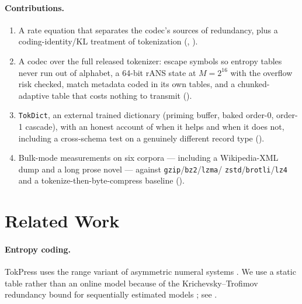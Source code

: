 \documentclass[10pt,twocolumn]{article}
\theoremstyle{plain}
\theoremstyle{definition}
\begin{document}
\paragraph{Contributions.}
\begin{enumerate}\itemsep2pt
\item A rate equation that separates the codec's sources of redundancy, plus a
coding-identity/KL treatment of tokenization (, ).
\item A codec over the full released tokenizer: escape symbols so entropy tables
never run out of alphabet, a 64-bit rANS state at $M=2^{16}$ with the overflow risk
checked, match metadata coded in its own tables, and a chunked-adaptive table that
costs nothing to transmit ().
\item \texttt{TokDict}, an external trained dictionary (priming buffer, baked order-0,
order-1 cascade), with an honest account of when it helps and when it does not,
including a cross-schema test on a genuinely different record type
().
\item Bulk-mode measurements on six corpora --- including a Wikipedia-XML dump and a
long prose novel --- against \texttt{gzip}/\texttt{bz2}/\texttt{lzma}/
\texttt{zstd}/\texttt{brotli}/\texttt{lz4} and a tokenize-then-byte-compress
baseline ().
\end{enumerate}

\section{Related Work}

\paragraph{Entropy coding.} TokPress uses the range variant of asymmetric numeral
systems \cite{duda2009}. We use a static table rather than an online model because of
the Krichevsky--Trofimov redundancy bound for sequentially estimated models
\cite{kt1981}; see .
\end{document}
